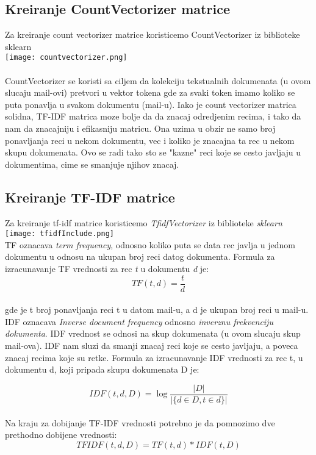 \documentclass{article}
\begin{document}
\subsection{Kreiranje CountVectorizer matrice}
Za kreiranje count vectorizer matrice koristicemo CountVectorizer iz biblioteke sklearn
\\

\texttt{[image: countvectorizer.png]}\\
\\
CountVectorizer se koristi sa ciljem da kolekciju tekstualnih dokumenata (u ovom slucaju mail-ovi) pretvori u vektor tokena gde za svaki token imamo koliko se puta ponavlja u svakom dokumentu (mail-u).
Iako je count vectorizer matrica solidna, TF-IDF matrica moze bolje da da znacaj odredjenim recima, i tako da nam da znacajniju i efikasniju matricu. Ona uzima u obzir ne samo broj ponavljanja reci u nekom dokumentu, vec i koliko je znacajna ta rec u nekom skupu dokumenata. Ovo se radi tako sto se "kazne" reci koje se cesto javljaju u dokumentima, cime se smanjuje njihov znacaj.

\clearpage
\subsection{Kreiranje TF-IDF matrice}
Za kreiranje tf-idf matrice koristicemo \textit{TfidfVectorizer} iz biblioteke \textit{sklearn}\\

\texttt{[image: tfidfInclude.png]}\\
TF oznacava \textit{term frequency}, odnosno koliko puta se data rec javlja u jednom dokumentu u odnosu na ukupan broj reci datog dokumenta. Formula za izracunavanje TF vrednosti za rec \textit{t} u dokumentu \textit{d} je:\\

$$TF(t,d) = \frac{t}{d}$$\\
gde je t broj ponavljanja reci t u datom mail-u, a d je ukupan broj reci u mail-u.\\ 
IDF oznacava \textit{Inverse document frequency} odnosno \textit{inverznu frekvenciju dokumenta}.
IDF vrednost se odnosi na skup dokumenata (u ovom slucaju skup mail-ova). IDF nam sluzi da smanji znacaj reci koje se cesto javljaju, a poveca znacaj recima koje su retke. Formula za izracunavanje IDF vrednosti za rec t, u dokumentu d, koji pripada skupu dokumenata D je:

$$ IDF(t,d,D) = \log\frac{|D|}{|\{d\in D, t \in d\}|} $$\\
Na kraju za dobijanje TF-IDF vrednosti potrebno je da pomnozimo dve prethodno dobijene vrednosti:
$$TFIDF(t,d,D) = TF(t,d) * IDF(t,D)$$
\end{document}
